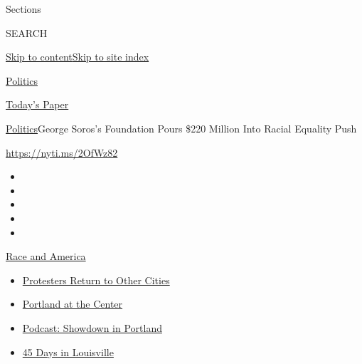 Sections

SEARCH

\protect\hyperlink{site-content}{Skip to
content}\protect\hyperlink{site-index}{Skip to site index}

\href{https://www.nytimes.com/section/politics}{Politics}

\href{https://myaccount.nytimes.com/auth/login?response_type=cookie\&client_id=vi}{}

\href{https://www.nytimes.com/section/todayspaper}{Today's Paper}

\href{/section/politics}{Politics}\textbar{}George Soros's Foundation
Pours \$220 Million Into Racial Equality Push

\url{https://nyti.ms/2OfWz82}

\begin{itemize}
\item
\item
\item
\item
\item
\end{itemize}

\href{https://www.nytimes.com/news-event/george-floyd-protests-minneapolis-new-york-los-angeles?action=click\&pgtype=Article\&state=default\&region=TOP_BANNER\&context=storylines_menu}{Race
and America}

\begin{itemize}
\tightlist
\item
  \href{https://www.nytimes.com/2020/07/26/us/protests-portland-seattle-trump.html?action=click\&pgtype=Article\&state=default\&region=TOP_BANNER\&context=storylines_menu}{Protesters
  Return to Other Cities}
\item
  \href{https://www.nytimes.com/2020/07/24/us/portland-oregon-protests-white-race.html?action=click\&pgtype=Article\&state=default\&region=TOP_BANNER\&context=storylines_menu}{Portland
  at the Center}
\item
  \href{https://www.nytimes.com/2020/07/23/podcasts/the-daily/portland-protests.html?action=click\&pgtype=Article\&state=default\&region=TOP_BANNER\&context=storylines_menu}{Podcast:
  Showdown in Portland}
\item
  \href{https://www.nytimes.com/interactive/2020/07/16/us/black-lives-matter-protests-louisville-breonna-taylor.html?action=click\&pgtype=Article\&state=default\&region=TOP_BANNER\&context=storylines_menu}{45
  Days in Louisville}
\end{itemize}


